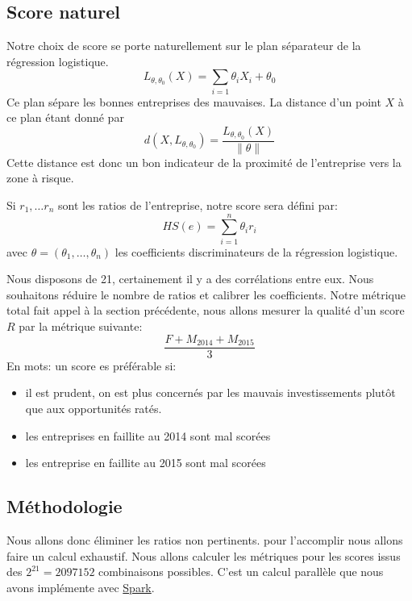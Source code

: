 \documentclass[DIV=calc, paper=a4, fontsize=11pt, twocolumn]{scrartcl}
\begin{document}
\subsection{Score naturel}
Notre choix de score se porte naturellement sur le plan séparateur de la régression logistique. 
$$L_{\theta, \theta_0}(X) = \sum_{i=1} \theta_i X_i + \theta_0$$
Ce plan sépare les bonnes entreprises des mauvaises. La distance d'un point $X$ à ce plan étant donné par
$$d(X, L_{\theta, \theta_0}) = \frac{L_{\theta, \theta_0}(X)}{\| \theta \|}$$
Cette distance est donc un bon indicateur de la proximité de l'entreprise vers la zone à risque. 

Si $r_1, \ldots r_n$ sont les ratios de l'entreprise, notre score sera défini par:
$$HS(e) = \sum_{i=1}^n \theta_i r_i$$
avec $\theta = (\theta_1, \ldots, \theta_n)$ les coefficients discriminateurs de la régression logistique.

Nous disposons de 21, certainement il y a des corrélations entre eux. Nous souhaitons réduire le nombre de ratios et calibrer les coefficients. Notre métrique total fait appel à la section précédente, nous allons mesurer la qualité d'un score $R$ par la métrique suivante:
$$\frac{F + M_{2014} + M_{2015}}{3}$$
En mots: un score es préférable si:
\begin{itemize}
\item il est prudent, on est plus concernés par les  mauvais investissements plutôt que aux opportunités ratés.
\item les entreprises en faillite au 2014 sont mal scorées
\item les entreprise en faillite au 2015 sont mal scorées
\end{itemize}
\subsection{Méthodologie}
Nous allons donc éliminer les ratios non pertinents. pour l'accomplir nous allons faire un calcul exhaustif. Nous allons calculer les métriques pour les scores issus des $2^{21} = 2 097 152$ combinaisons possibles. C'est un calcul parallèle que nous avons implémente avec  \href{http://spark.apache.org/}{Spark}.
\end{document}

